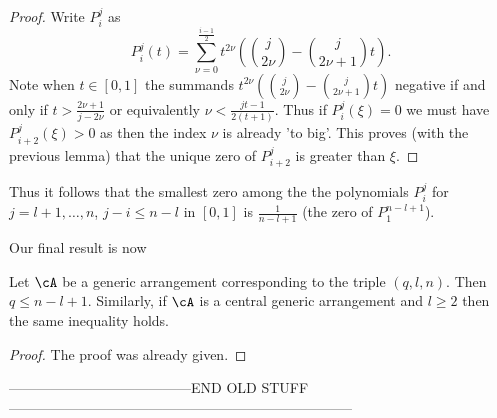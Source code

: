 \begin{proof}
  Write $P_i^j$ as
  $$
    P_i^j(t)=\sum_{\nu=0}^{\frac{i-1}{2}}{t^{2\nu}\left(\binom{j}{2\nu}-\binom{j}{2\nu+1}t\right)}\text{.}
  $$
  Note when $t\in[0,1]$ the summands $t^{2\nu}\left(\binom{j}{2\nu}-\binom{j}{2\nu+1}t\right)$ negative if and only if $t>\frac{2\nu+1}{j-2\nu}$ or equivalently $\nu<\frac{jt-1}{2(t+1)}$. Thus if $P_i^j(\xi)=0$ we must have $P_{i+2}^j(\xi)>0$ as then the index $\nu$ is already 'to big'.
  This proves (with the previous lemma) that the unique zero of $P_{i+2}^j$ is greater than $\xi$.
\end{proof}

Thus it follows that the smallest zero among the the polynomials $P_i^j$ for $j=l+1,\ldots,n$, $j-i\leq n-l$ in $[0,1]$ is $\frac{1}{n-l+1}$ (the zero of $P_1^{n-l+1}$).

Our final result is now

\begin{lemma} Let $\cA$ be a generic arrangement corresponding to the triple $(q,l,n)$. Then $q\leq n-l+1$. Similarly, if $\cA$ is a central generic arrangement and $l\geq 2$ then the same inequality holds.
\end{lemma}

\begin{proof}
  The proof was already given.
\end{proof}

---------------------------------------END OLD STUFF--------------------------------------------------------------------------
